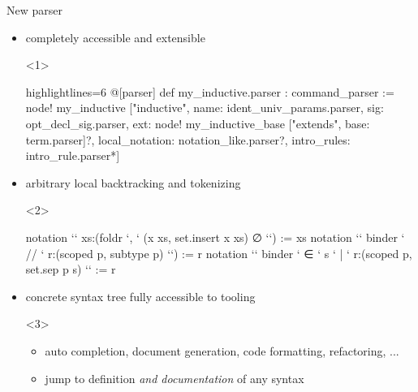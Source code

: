 \documentclass[t]{beamer}
\begin{document}
\begin{frame}[fragile]{New parser }
  \begin{itemize}
  \item completely accessible and extensible
    \begin{onlyenv}<1>
\begin{leancode*}{highlightlines={6}}
@[parser]
def my_inductive.parser : command_parser :=
node! my_inductive ["inductive",
  name: ident_univ_params.parser,
  sig: opt_decl_sig.parser,
  ext: node! my_inductive_base ["extends", base: term.parser]?,
  local_notation: notation_like.parser?,
  intro_rules: intro_rule.parser*]
\end{leancode*}
    \end{onlyenv}
    \pause
  \item arbitrary local backtracking and tokenizing
    \begin{onlyenv}<2>
\begin{leancode}
notation `{` xs:(foldr `, ` (x xs, set.insert x xs) ∅ `}`)      := xs
notation `{` binder ` // ` r:(scoped p, subtype p) `}`)         := r
notation `{` binder ` ∈ ` s ` | ` r:(scoped p, set.sep p s) `}` := r
\end{leancode}

      \vspace{-3cm}
    \end{onlyenv}
    \pause
  \item concrete syntax tree fully accessible to tooling
    \begin{onlyenv}<3>
      \begin{itemize}
      \item auto completion, document generation, code formatting, refactoring,
        ...
      \item jump to definition \emph{and documentation} of any syntax
      \end{itemize}
    \end{onlyenv}
  \end{itemize}
\end{frame}
\end{document}
